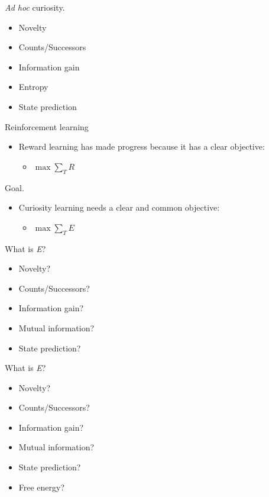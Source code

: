 \documentclass[10pt]{beamer}
\begin{document}
\begin{frame}[fragile]{\textit{Ad hoc} curiosity.}
\begin{itemize}
    \item Novelty
    \item Counts/Successors
    \item Information gain
    \item Entropy
    \item State prediction
\end{itemize}
\end{frame}

\begin{frame}[fragile]{Reinforcement learning}
\begin{itemize}
    \item Reward learning has made progress because it has a clear objective:
    \begin{itemize}
        \item $ \max \sum_T R$
    \end{itemize}
\end{itemize}
\end{frame}

\begin{frame}[fragile]{Goal.}
\begin{itemize}
    \item Curiosity learning needs a clear and common objective:
    \begin{itemize}
        \item $ \max \sum_T E$
    \end{itemize}
\end{itemize}
\end{frame}

\begin{frame}[fragile]{What is \textit{E}?}
\begin{itemize}
    \item Novelty?
    \item Counts/Successors?
    \item Information gain?
    \item Mutual information? 
    \item State prediction?
\end{itemize}
\end{frame}

\begin{frame}[fragile]{What is \textit{E}?}
\begin{itemize}
    \item Novelty?
    \item Counts/Successors?
    \item Information gain?
    \item Mutual information?
    \item State prediction?
    \item \alert{Free energy?}
\end{itemize}
\end{frame}
\end{document}
